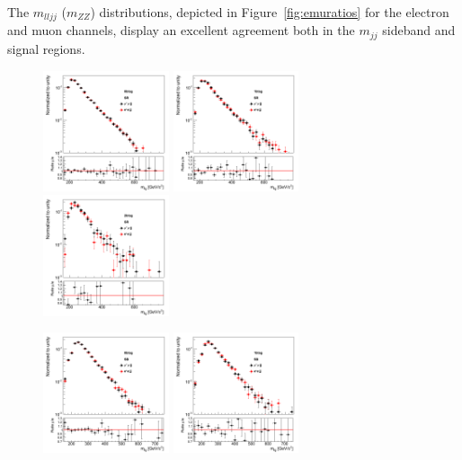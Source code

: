 
The $m_{lljj}$ ($m_{ZZ}$) distributions, depicted in Figure~\ref{fig:emuratios}
for the electron and muon channels, display an
excellent agreement both in the $m_{jj}$ sideband and signal regions.

\begin{figure}[htb]
\begin{center}
\centerline{
\includegraphics[width=0.33\textwidth]{plots/mH_lim20_0btag_NORM_LOG.png}
\includegraphics[width=0.33\textwidth]{plots/mH_lim20_1btag_NORM_LOG.png}
\includegraphics[width=0.33\textwidth]{plots/mH_lim20_2btag_NORM_LOG.png}
}
\centerline{
\includegraphics[width=0.33\textwidth]{plots/mH_lim20_0btag-SB_NORM_LOG.png}
\includegraphics[width=0.33\textwidth]{plots/mH_lim20_1btag-SB_NORM_LOG.png}
}
\end{center}
\end{figure}
